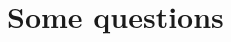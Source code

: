 \documentclass{report}
\begin{document}
	\section{Some questions}
	\startsection
	\closesection
\end{document}
